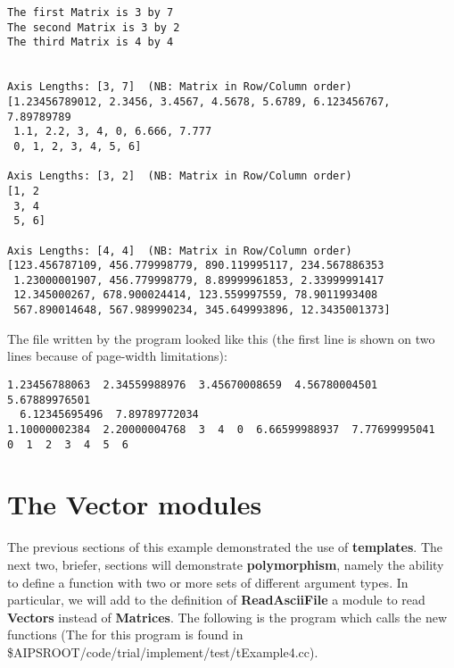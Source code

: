 \begin{verbatim}
The first Matrix is 3 by 7
The second Matrix is 3 by 2
The third Matrix is 4 by 4


Axis Lengths: [3, 7]  (NB: Matrix in Row/Column order)
[1.23456789012, 2.3456, 3.4567, 4.5678, 5.6789, 6.123456767, 7.89789789
 1.1, 2.2, 3, 4, 0, 6.666, 7.777
 0, 1, 2, 3, 4, 5, 6]

Axis Lengths: [3, 2]  (NB: Matrix in Row/Column order)
[1, 2
 3, 4
 5, 6]

Axis Lengths: [4, 4]  (NB: Matrix in Row/Column order)
[123.456787109, 456.779998779, 890.119995117, 234.567886353
 1.23000001907, 456.779998779, 8.89999961853, 2.33999991417
 12.345000267, 678.900024414, 123.559997559, 78.9011993408
 567.890014648, 567.989990234, 345.649993896, 12.3435001373]
\end{verbatim}


	The file written by the program looked like this (the first line is 
shown on two lines because of page-width limitations):

\begin{verbatim}
1.23456788063  2.34559988976  3.45670008659  4.56780004501  5.67889976501
  6.12345695496  7.89789772034  
1.10000002384  2.20000004768  3  4  0  6.66599988937  7.77699995041  
0  1  2  3  4  5  6  
\end{verbatim}

	

\newpage
\section{The Vector modules}
 
	The previous sections of this example demonstrated the use of
{\bf templates}. The next two, briefer, sections will demonstrate 
{\bf polymorphism}, namely the ability to define a function with two or more
sets of different argument types.  In particular, we will add to the definition
of {\bf ReadAsciiFile} a module to read {\bf Vectors} instead of {\bf Matrices}.
The following is the program which calls the new functions
(The 
for this program is found in 
\$AIPSROOT/code/trial/implement/test/tExample4.cc). 

